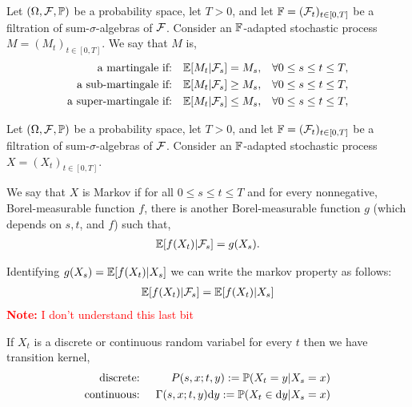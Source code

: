 \documentclass[12pt]{article}
\newcommand{\note}[1]{\textcolor{red}{\textbf{Note:} #1}}
\begin{document}
\begin{definition}[Martingale]
Let \( (\Omega,\mathcal{F},\mathbb{P}) \) be a probability space, let \( T > 0 \), and let \( \mathbb{F} = (\mathcal{F}_t)_{t\in[0,T]} \) be a filtration of sum-\(\sigma\)-algebras of \( \mathcal{F} \). Consider an \( \mathbb{F} \)-adapted stochastic process \( M = (M_t)_{t\in[0,T]} \). We say that \( M \) is,
\begin{align*}
    \text{a martingale if:} && \mathbb{E}[M_t | \mathcal{F}_s] = M_s, && \forall 0\leq s\leq t\leq T, \\
    \text{a sub-martingale if:} && \mathbb{E}[M_t | \mathcal{F}_s] \geq M_s, && \forall 0\leq s\leq t\leq T, \\
    \text{a super-martingale if:} && \mathbb{E}[M_t | \mathcal{F}_s] \leq M_s, && \forall 0\leq s\leq t\leq T, \\
\end{align*}
\end{definition}

\begin{definition}[Markov]
Let \( (\Omega,\mathcal{F},\mathbb{P}) \) be a probability space, let \( T > 0 \), and let \( \mathbb{F} = (\mathcal{F}_t)_{t\in[0,T]} \) be a filtration of sum-\(\sigma\)-algebras of \( \mathcal{F} \). Consider an \( \mathbb{F} \)-adapted stochastic process \( X = (X_t)_{t\in[0,T]} \).

We say that \( X \) is Markov if for all \( 0\leq s \leq t \leq T \) and for every nonnegative, Borel-measurable function \( f \), there is another Borel-measurable function \( g \) (which depends on \( s,t \), and \( f \)) such that,
\begin{align*}
    \mathbb{E}[f(X_t) | \mathcal{F}_s] = g(X_s).
\end{align*}

Identifying \( g(X_s) = \mathbb{E}[f(X_t) | X_s] \) we can write the markov property as follows:
\begin{align*}
    \mathbb{E}[f(X_t) | \mathcal{F}_s] = \mathbb{E}[f(X_t) | X_s]
\end{align*}
\note{I don't understand this last bit}
\end{definition}

\begin{definition}
If \( X_t \) is a discrete or continuous random variabel for every \( t \) then we have transition kernel,
\begin{align*}
    \text{discrete: } && P(s,x;t,y) := \mathbb{P}(X_t = y | X_s = x) \\
    \text{continuous: } && \Gamma(s,x;t,y)\mathrm{d} y := \mathbb{P}(X_t \in \mathrm{d} y | X_s = x)
\end{align*}
\end{definition}
\end{document}
